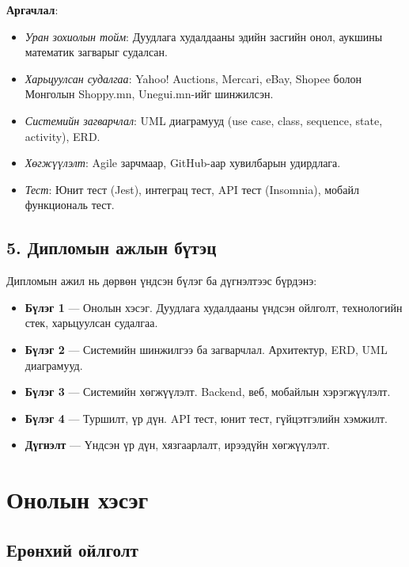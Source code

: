 \documentclass[12pt, a4paper]{report}
\begin{document}
\textbf{Аргачлал}:
\begin{itemize}
  \item \textit{Уран зохиолын тойм}: Дуудлага худалдааны эдийн засгийн онол, аукшины математик загварыг судалсан.
  \item \textit{Харьцуулсан судалгаа}: Yahoo! Auctions, Mercari, eBay, Shopee болон Монголын Shoppy.mn, Unegui.mn-ийг шинжилсэн.
  \item \textit{Системийн загварчлал}: UML диаграмууд (use case, class, sequence, state, activity), ERD.
  \item \textit{Хөгжүүлэлт}: Agile зарчмаар, GitHub-аар хувилбарын удирдлага.
  \item \textit{Тест}: Юнит тест (Jest), интеграц тест, API тест (Insomnia), мобайл функциональ тест.
\end{itemize}

\section*{5. Дипломын ажлын бүтэц}

Дипломын ажил нь дөрвөн үндсэн бүлэг ба дүгнэлтээс бүрдэнэ:
\begin{itemize}
  \item \textbf{Бүлэг 1} — Онолын хэсэг. Дуудлага худалдааны үндсэн ойлголт, технологийн стек, харьцуулсан судалгаа.
  \item \textbf{Бүлэг 2} — Системийн шинжилгээ ба загварчлал. Архитектур, ERD, UML диаграмууд.
  \item \textbf{Бүлэг 3} — Системийн хөгжүүлэлт. Backend, веб, мобайлын хэрэгжүүлэлт.
  \item \textbf{Бүлэг 4} — Туршилт, үр дүн. API тест, юнит тест, гүйцэтгэлийн хэмжилт.
  \item \textbf{Дүгнэлт} — Үндсэн үр дүн, хязгаарлалт, ирээдүйн хөгжүүлэлт.
\end{itemize}

\chapter{Онолын хэсэг}

\section{Ерөнхий ойлголт}
\end{document}
